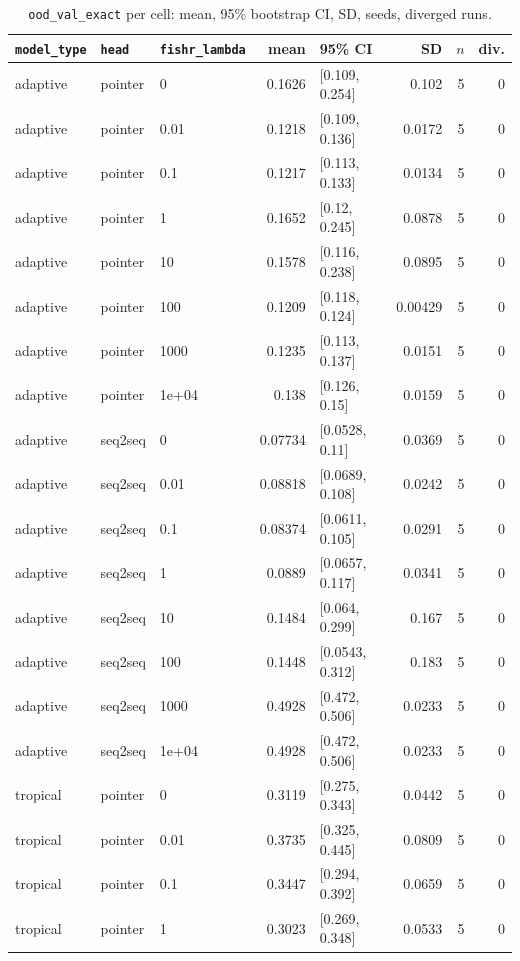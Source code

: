 \documentclass[10pt]{article}
\begin{document}
{\small
\begin{longtable}{lllrlrrr}
\caption{\texttt{ood\_val\_exact} per cell: mean, 95\% bootstrap CI, SD, seeds, diverged runs.}\label{tab:summary-ood_val_exact}\\
\toprule
\texttt{model\_type} & \texttt{head} & \texttt{fishr\_lambda} & mean & 95\% CI & SD & $n$ & div.\\
\midrule
\endhead
adaptive & pointer & 0 & 0.1626 & [0.109, 0.254] & 0.102 & 5 & 0\\
adaptive & pointer & 0.01 & 0.1218 & [0.109, 0.136] & 0.0172 & 5 & 0\\
adaptive & pointer & 0.1 & 0.1217 & [0.113, 0.133] & 0.0134 & 5 & 0\\
adaptive & pointer & 1 & 0.1652 & [0.12, 0.245] & 0.0878 & 5 & 0\\
adaptive & pointer & 10 & 0.1578 & [0.116, 0.238] & 0.0895 & 5 & 0\\
adaptive & pointer & 100 & 0.1209 & [0.118, 0.124] & 0.00429 & 5 & 0\\
adaptive & pointer & 1000 & 0.1235 & [0.113, 0.137] & 0.0151 & 5 & 0\\
adaptive & pointer & 1e+04 & 0.138 & [0.126, 0.15] & 0.0159 & 5 & 0\\
adaptive & seq2seq & 0 & 0.07734 & [0.0528, 0.11] & 0.0369 & 5 & 0\\
adaptive & seq2seq & 0.01 & 0.08818 & [0.0689, 0.108] & 0.0242 & 5 & 0\\
adaptive & seq2seq & 0.1 & 0.08374 & [0.0611, 0.105] & 0.0291 & 5 & 0\\
adaptive & seq2seq & 1 & 0.0889 & [0.0657, 0.117] & 0.0341 & 5 & 0\\
adaptive & seq2seq & 10 & 0.1484 & [0.064, 0.299] & 0.167 & 5 & 0\\
adaptive & seq2seq & 100 & 0.1448 & [0.0543, 0.312] & 0.183 & 5 & 0\\
adaptive & seq2seq & 1000 & 0.4928 & [0.472, 0.506] & 0.0233 & 5 & 0\\
adaptive & seq2seq & 1e+04 & 0.4928 & [0.472, 0.506] & 0.0233 & 5 & 0\\
tropical & pointer & 0 & 0.3119 & [0.275, 0.343] & 0.0442 & 5 & 0\\
tropical & pointer & 0.01 & 0.3735 & [0.325, 0.445] & 0.0809 & 5 & 0\\
tropical & pointer & 0.1 & 0.3447 & [0.294, 0.392] & 0.0659 & 5 & 0\\
tropical & pointer & 1 & 0.3023 & [0.269, 0.348] & 0.0533 & 5 & 0\\

\end{longtable}}
\end{document}

